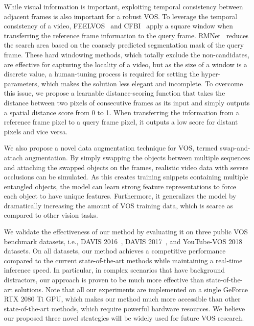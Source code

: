 \documentclass[runningheads]{llncs}
\begin{document}
While visual information is important, exploiting temporal consistency between adjacent frames is also important for a robust VOS. To leverage the temporal consistency of a video, FEELVOS~\cite{FEELVOS} and CFBI~\cite{CFBI} apply a square window when transferring the reference frame information to the query frame. RMNet~\cite{RMNet} reduces the search area based on the coarsely predicted segmentation mask of the query frame. These hard windowing methods, which totally exclude the non-candidates, are effective for capturing the locality of a video, but as the size of a window is a discrete value, a human-tuning process is required for setting the hyper-parameters, which makes the solution less elegant and incomplete. To overcome this issue, we propose a learnable distance-scoring function that takes the distance between two pixels of consecutive frames as its input and simply outputs a spatial distance score from 0 to 1. When transferring the information from a reference frame pixel to a query frame pixel, it outputs a low score for distant pixels and vice versa.



We also propose a novel data augmentation technique for VOS, termed swap-and-attach augmentation. By simply swapping the objects between multiple sequences and attaching the swapped objects on the frames, realistic video data with severe occlusions can be simulated. As this creates training snippets containing multiple entangled objects, the model can learn strong feature representations to force each object to have unique features. Furthermore, it generalizes the model by dramatically increasing the amount of VOS training data, which is scarce as compared to other vision tasks.



We validate the effectiveness of our method by evaluating it on three public VOS benchmark datasets, i.e., DAVIS 2016~\cite{DAVIS2016}, DAVIS 2017~\cite{DAVIS2017}, and YouTube-VOS 2018~\cite{YTVOS} datasets. On all datasets, our method achieves a competitive performance compared to the current state-of-the-art methods while maintaining a real-time inference speed. In particular, in complex scenarios that have background distractors, our approach is proven to be much more effective than state-of-the-art solutions. Note that all our experiments are implemented on a single GeForce RTX 2080 Ti GPU, which makes our method much more accessible than other state-of-the-art methods, which require powerful hardware resources. We believe our proposed three novel strategies will be widely used for future VOS research. 
\end{document}
